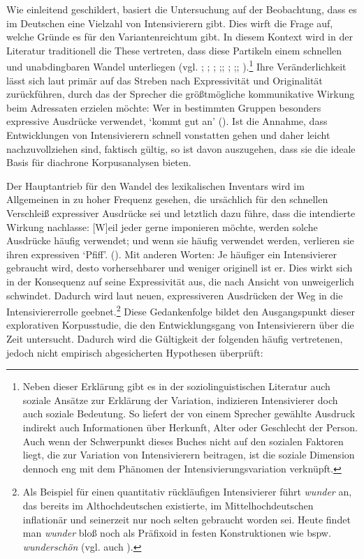 Wie einleitend geschildert, basiert die Untersuchung auf der Beobachtung, dass es im Deutschen eine Vielzahl von Intensivierern gibt. Dies wirft die Frage auf, welche Gründe es für den Variantenreichtum gibt. In diesem Kontext wird in der Literatur traditionell die These vertreten, dass diese Partikeln einem schnellen und unabdingbaren Wandel unterliegen (vgl. \citealt[2]{Hauschild.1899}; \citealt[267]{Becher.1907}; \citealt[274]{Baumgarten.1908}; \citealt[126f.]{Biedermann.1969};; \citealt[18]{Bolinger.1972}; \citealt[216f.]{Keller.1995};; \citealt[257]{Ito.2003}).\footnote{Neben dieser Erklärung gibt es in der soziolinguistischen Literatur auch soziale Ansätze zur Erklärung der Variation, indizieren Intensivierer doch auch soziale Bedeutung. So liefert der von einem Sprecher gewählte Ausdruck indirekt auch Informationen über Herkunft, Alter oder Geschlecht der Person. Auch wenn der Schwerpunkt dieses Buches nicht auf den sozialen Faktoren liegt, die zur Variation von Intensivierern beitragen, ist die soziale Dimension dennoch eng mit dem Phänomen der Intensivierungsvariation verknüpft.} Ihre Veränderlichkeit lässt sich laut \citet[189ff.]{Kirschbaum.2002b} primär auf das Streben nach Expressivität und Originalität zurückführen, durch das der Sprecher die größtmögliche kommunikative Wirkung beim Adressaten erzielen möchte: \glqq{}Wer in bestimmten Gruppen besonders expressive Ausdrücke verwendet, `kommt gut an'\grqq{} (\citealt[3]{Keller.2003}). Ist die Annahme, dass Entwicklungen von Intensivierern schnell vonstatten gehen und daher leicht nachzuvollziehen sind, faktisch gültig, so ist davon auszugehen, dass sie die ideale Basis für diachrone Korpusanalysen bieten.

Der Hauptantrieb für den Wandel des lexikalischen Inventars wird im Allgemeinen in zu hoher Frequenz gesehen, die ursächlich für den schnellen Verschleiß expressiver Ausdrücke sei und letztlich dazu führe, dass die intendierte Wirkung nachlasse: \glqq{}[W]eil jeder gerne imponieren möchte, werden solche Ausdrücke häufig verwendet; und wenn sie häufig verwendet werden, verlieren sie ihren expressiven `Pfiff'.\grqq{} (\citealt[3]{Keller.2003}). Mit anderen Worten: Je häufiger ein Intensivierer gebraucht wird, desto vorhersehbarer und weniger originell ist er. Dies wirkt sich in der Konsequenz auf seine Expressivität aus, die nach Ansicht von \citet[2]{Hauschild.1899} unweigerlich schwindet. Dadurch wird laut \citet[274]{Baumgarten.1908} neuen, expressiveren Ausdrücken der Weg in die Intensiviererrolle geebnet.\footnote{Als Beispiel für einen quantitativ rückläufigen Intensivierer führt \citet[10f.]{Hauschild.1899} \textit{wunder} an, das bereits im Althochdeutschen existierte, im Mittelhochdeutschen inflationär und seinerzeit nur noch selten gebraucht worden sei. Heute findet man \textit{wunder} bloß noch als Präfixoid in festen Konstruktionen wie bspw. \textit{wunderschön} (vgl. auch \citealt[228]{Pittner.1989}).}
Diese Gedankenfolge bildet den Ausgangspunkt dieser explorativen Korpusstudie, die den Entwicklungsgang von Intensivierern über die Zeit untersucht. Dadurch wird die Gültigkeit der folgenden häufig vertretenen, jedoch nicht empirisch abgesicherten Hypothesen überprüft:

